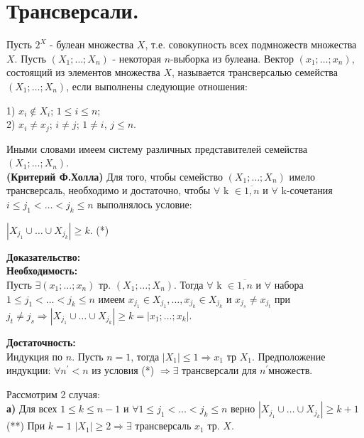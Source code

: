 \section{Трансверсали.}

\opri Пусть $2^{X}$ - булеан множества $X$, т.е. совокупность всех подмножеств множества $X$. Пусть $(X_1; \dots; X_n)$ - некоторая $n$-выборка из булеана. Вектор $(x_1; \dots; x_n)$, состоящий из элементов множества $X$, называется трансверсалью семейства $(X_1; \dots; X_n)$, если выполнены следующие отношения:

\begin{center}
1) $x_i \notin X_i$; $1 \leq i \leq n$;\\
2) $x_i \neq x_j$; $i \neq j$; $1 \neq i$, $j \leq n$.
\end{center}

Иными словами имеем систему различных представителей семейства $(X_1; \dots; X_n)$.\\

\thr \textbf{(Критерий Ф.Холла)}
Для того, чтобы семейство $(X_1; \dots; X_n)$ имело трансверсаль, необходимо и достаточно, чтобы $\forall$ k $\in \overline{1,n}$ и $\forall$ k-сочетания $i \leq j_1 < \dots < j_k \leq n$ выполнялось условие:

\begin{center}
$|X_{j_1} \cup \dots \cup X_{j_k}|\geq k$. (*)
\end{center}

\textbf{Доказательство:}\\

\textbf{Необходимость:}\\
Пусть $\exists (x_1; \dots; x_n)$ тр. $ (X_1; \dots; X_n)$. Тогда $ \forall$ k $\in \overline{1,n}$ и $\forall$ набора $1 \leq j_1 < \dots < j_k\leq n$ имеем $x_{j_1} \in X_{j_1}, \dots, x_{j_k} \in X_{j_k}$ и $x_{j_s} \neq x_{j_t}$ при $j_t \neq j_s \Rightarrow |X_{j_1} \cup \dots \cup X_{j_k}| \geq k = |{x_1; \dots; x_k}|$.

\textbf{Достаточность:}\\
Индукция по $n$. Пусть $n=1$, тогда
$|X_1| \leq 1 \Rightarrow {x_1}$ тр $X_1$.
Предположение индукции: $\forall n^' < n$ из условия (*) $\Rightarrow \exists$ трансверсали для $n^'$множеств. 

Рассмотрим 2 случая:\\

\textbf{а)} Для всех $1 \leq k \leq n-1$ и $\forall 1 \leq j_1 < \dots < j_k \leq n$ верно $|X_{j_1} \cup \dots \cup X_{j_k}| \geq k+1$ (**)
При $k=1$ $|X_1| \geq 2 \Rightarrow \exists$ трансверсаль $x_1$ тр. $X$.

